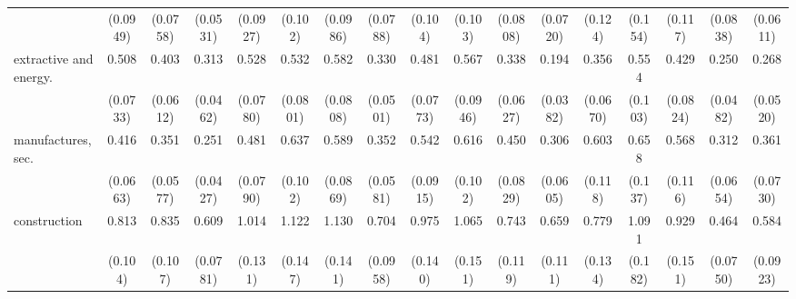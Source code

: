 {\begin{tabular}{l*{16}{c}}
                    &    (0.0949)         &    (0.0758)         &    (0.0531)         &    (0.0927)         &     (0.102)         &    (0.0986)         &    (0.0788)         &     (0.104)         &     (0.103)         &    (0.0808)         &    (0.0720)         &     (0.124)         &     (0.154)         &     (0.117)         &    (0.0838)         &    (0.0611)         \\
[1em]
extractive and energy.&       0.508\sym{***}&       0.403\sym{***}&       0.313\sym{***}&       0.528\sym{***}&       0.532\sym{***}&       0.582\sym{***}&       0.330\sym{***}&       0.481\sym{***}&       0.567\sym{***}&       0.338\sym{***}&       0.194\sym{***}&       0.356\sym{***}&       0.554\sym{**} &       0.429\sym{***}&       0.250\sym{***}&       0.268\sym{***}\\
                    &    (0.0733)         &    (0.0612)         &    (0.0462)         &    (0.0780)         &    (0.0801)         &    (0.0808)         &    (0.0501)         &    (0.0773)         &    (0.0946)         &    (0.0627)         &    (0.0382)         &    (0.0670)         &     (0.103)         &    (0.0824)         &    (0.0482)         &    (0.0520)         \\
[1em]
manufactures, sec.  &       0.416\sym{***}&       0.351\sym{***}&       0.251\sym{***}&       0.481\sym{***}&       0.637\sym{**} &       0.589\sym{***}&       0.352\sym{***}&       0.542\sym{***}&       0.616\sym{**} &       0.450\sym{***}&       0.306\sym{***}&       0.603\sym{**} &       0.658\sym{*}  &       0.568\sym{**} &       0.312\sym{***}&       0.361\sym{***}\\
                    &    (0.0663)         &    (0.0577)         &    (0.0427)         &    (0.0790)         &     (0.102)         &    (0.0869)         &    (0.0581)         &    (0.0915)         &     (0.102)         &    (0.0829)         &    (0.0605)         &     (0.118)         &     (0.137)         &     (0.116)         &    (0.0654)         &    (0.0730)         \\
[1em]
construction        &       0.813         &       0.835         &       0.609\sym{***}&       1.014         &       1.122         &       1.130         &       0.704\sym{**} &       0.975         &       1.065         &       0.743         &       0.659\sym{*}  &       0.779         &       1.091         &       0.929         &       0.464\sym{***}&       0.584\sym{***}\\
                    &     (0.104)         &     (0.107)         &    (0.0781)         &     (0.131)         &     (0.147)         &     (0.141)         &    (0.0958)         &     (0.140)         &     (0.151)         &     (0.119)         &     (0.111)         &     (0.134)         &     (0.182)         &     (0.151)         &    (0.0750)         &    (0.0923)         \\

\end{tabular}}
